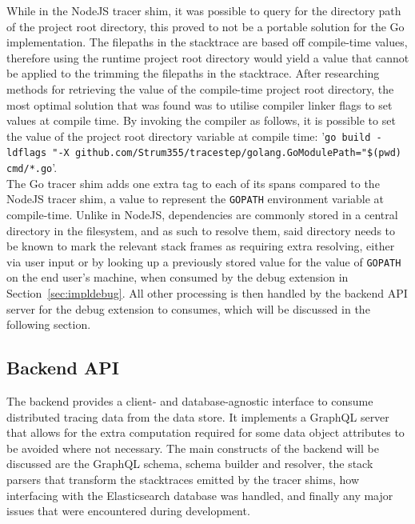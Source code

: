 \documentclass[12pt,pdftex,titlepage]{report}
\begin{document}
                    While in the NodeJS tracer shim, it was possible to query for the directory path of the project root directory, this proved to not be a portable solution for the Go implementation. The filepaths
                    in the stacktrace are based off compile-time values, therefore using the runtime project root directory would yield a value that cannot be applied to the trimming the filepaths in the stacktrace. 
                    After researching methods for retrieving the value of the compile-time project root directory, the most optimal solution that was found was to utilise compiler linker flags to set values at compile
                    time\cite{golangldflag}. By invoking the compiler as follows, it is possible to set the value of the project root directory variable at compile time: '\texttt{go build -ldflags "-X 
                    github.com/Strum355/tracestep/golang.GoModulePath="\$(pwd) cmd/*.go}'. \\The Go tracer shim adds one extra tag to each of its spans compared to the NodeJS tracer shim, a value to represent the 
                    \texttt{GOPATH} environment variable at compile-time. Unlike in NodeJS, dependencies are commonly stored in a central directory in the filesystem, and as such to resolve them, said directory needs to
                    be known to mark the relevant stack frames as requiring extra resolving, either via user input or by looking up a previously stored value for the value of \texttt{GOPATH} on the end user's machine,
                    when consumed by the debug extension in Section~\ref{sec:impldebug}. All other processing is then handled by the backend API server for the debug extension to consumes, which will be discussed in the 
                    following section.

                

            \subsection{Backend API}
            \label{sec:backend}
                The backend provides a client- and database-agnostic interface to consume distributed tracing data from the data store. It implements a GraphQL server that allows for the extra computation
                required for some data object attributes to be avoided where not necessary. The main constructs of the backend will be discussed are the GraphQL schema, schema builder and resolver, the stack
                parsers that transform the stacktraces emitted by the tracer shims, how interfacing with the Elasticsearch database was handled, and finally any major issues that were encountered during development.
\end{document}
